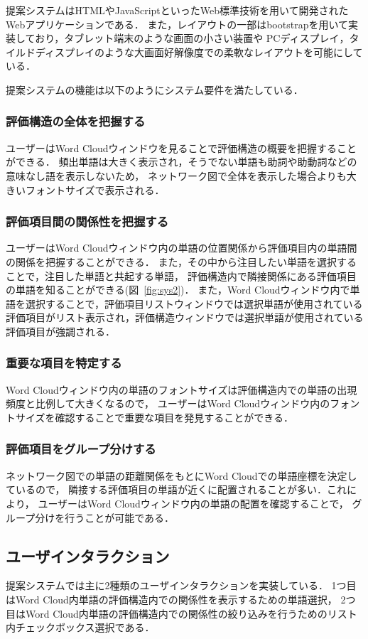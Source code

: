 \documentclass[syuuron]{kuee}
\begin{document}
			提案システムはHTMLやJavaScriptといったWeb標準技術を用いて開発されたWebアプリケーションである．
			また，レイアウトの一部はbootstrapを用いて実装しており，タブレット端末のような画面の小さい装置や
			PCディスプレイ，タイルドディスプレイのような大画面好解像度での柔軟なレイアウトを可能にしている．
			
			提案システムの機能は以下のようにシステム要件を満たしている．
			\subsubsection{評価構造の全体を把握する}
				ユーザーはWord Cloudウィンドウを見ることで評価構造の概要を把握することができる．
				頻出単語は大きく表示され，そうでない単語も助詞や助動詞などの意味なし語を表示しないため，
				ネットワーク図で全体を表示した場合よりも大きいフォントサイズで表示される．
			\subsubsection{評価項目間の関係性を把握する}
				ユーザーはWord Cloudウィンドウ内の単語の位置関係から評価項目内の単語間の関係を把握することができる．
				また，その中から注目したい単語を選択することで，注目した単語と共起する単語，
				評価構造内で隣接関係にある評価項目の単語を知ることができる(図~\ref{fig:sys2})．
				また，Word Cloudウィンドウ内で単語を選択することで，評価項目リストウィンドウでは選択単語が使用されている
				評価項目がリスト表示され，評価構造ウィンドウでは選択単語が使用されている
				評価項目が強調される．
			\subsubsection{重要な項目を特定する}
				Word Cloudウィンドウ内の単語のフォントサイズは評価構造内での単語の出現頻度と比例して大きくなるので，
				ユーザーはWord Cloudウィンドウ内のフォントサイズを確認することで重要な項目を発見することができる．
			\subsubsection{評価項目をグループ分けする}%
				ネットワーク図での単語の距離関係をもとにWord Cloudでの単語座標を決定しているので，
				隣接する評価項目の単語が近くに配置されることが多い．これにより，
				ユーザーはWord Cloudウィンドウ内の単語の配置を確認することで，
				グループ分けを行うことが可能である．
			
		\subsection{ユーザインタラクション}
			提案システムでは主に2種類のユーザインタラクションを実装している．
			1つ目はWord Cloud内単語の評価構造内での関係性を表示するための単語選択，
			2つ目はWord Cloud内単語の評価構造内での関係性の絞り込みを行うためのリスト内チェックボックス選択である．
			
\end{document}
